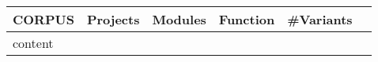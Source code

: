 {
    \renewcommand{\arraystretch}{0.5}
\begin{table*}
    \centering

        \begin{tabular}[t]{ l | l | l | l | l | l }
            \midrule
        CORPUS & Projects & Modules & Function & \#Variants  \\
        \hline       \hline

        {{content}}

        \end{tabular}
    
\end{table*}
}